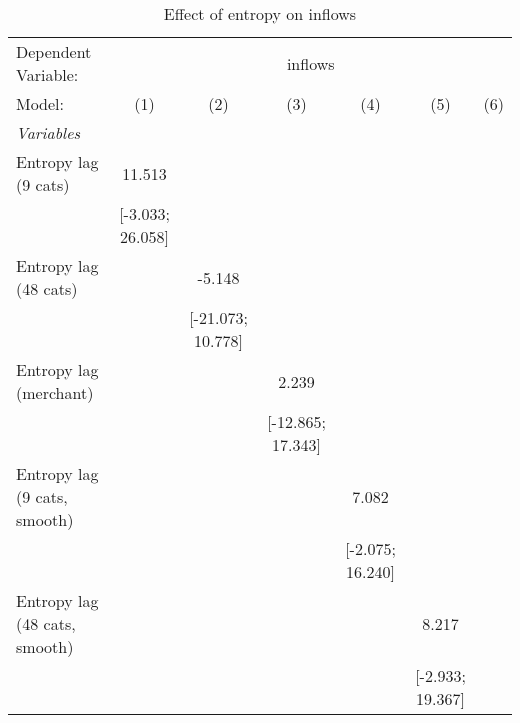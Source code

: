 
\begin{table}[htbp]
   \centering
   \tiny
   \begin{threeparttable}[b]
      \caption{\label{tab:reg_inflows_lag} Effect of entropy on inflows}
      \begin{tabular}{lcccccc}
         \tabularnewline \midrule \midrule
         Dependent Variable: & \multicolumn{6}{c}{inflows}\\
         Model:                         & (1)                  & (2)                  & (3)                  & (4)                  & (5)                  & (6)\\  
         \midrule
         \emph{Variables}\\
         Entropy lag (9 cats)           & 11.513               &                      &                      &                      &                      &   \\   
                                        & [-3.033; 26.058]     &                      &                      &                      &                      &   \\   
         Entropy lag (48 cats)          &                      & -5.148               &                      &                      &                      &   \\   
                                        &                      & [-21.073; 10.778]    &                      &                      &                      &   \\   
         Entropy lag (merchant)         &                      &                      & 2.239                &                      &                      &   \\   
                                        &                      &                      & [-12.865; 17.343]    &                      &                      &   \\   
         Entropy lag (9 cats, smooth)   &                      &                      &                      & 7.082                &                      &   \\   
                                        &                      &                      &                      & [-2.075; 16.240]     &                      &   \\   
         Entropy lag (48 cats, smooth)  &                      &                      &                      &                      & 8.217                &   \\   
                                        &                      &                      &                      &                      & [-2.933; 19.367]     &   \\   

\end{tabular}
\end{threeparttable}
\end{table}
